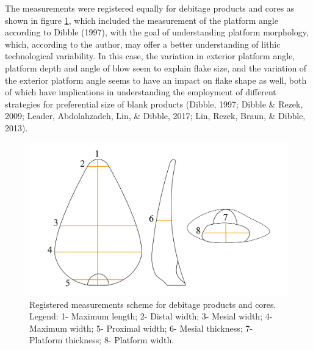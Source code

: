\documentclass[12pt,twoside]{reedthesis}
\begin{document}
The measurements were registered equally for debitage products and cores as shown in figure \ref{fig:metric}, which included the measurement of the platform angle according to Dibble (1997), with the goal of understanding platform morphology, which, according to the author, may offer a better understanding of lithic technological variability. In this case, the variation in exterior platform angle, platform depth and angle of blow seem to explain flake size, and the variation of the exterior platform angle seems to have an impact on flake shape as well, both of which have implications in understanding the employment of different strategies for preferential size of blank products (Dibble, 1997; Dibble \& Rezek, 2009; Leader, Abdolahzadeh, Lin, \& Dibble, 2017; Lin, Rezek, Braun, \& Dibble, 2013).
\begin{figure}
\includegraphics[width=1\linewidth]{figure/Metrics-01} \caption{Registered measurements scheme for debitage products and cores. Legend: 1- Maximum length; 2- Distal width; 3- Mesial width; 4- Maximum width; 5- Proximal width; 6- Mesial thickness; 7- Platform thickness; 8- Platform width.}\label{fig:metric}
\end{figure}
\end{document}
